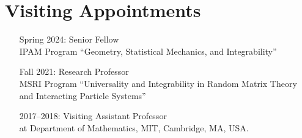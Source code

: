 \documentclass[letterpaper,11pt]{article}
\begin{document}
\section*{Visiting Appointments}

\begin{itemize}
	\item [Spring 2024:]
		  Senior Fellow
		  \\
		  IPAM Program ``Geometry, Statistical Mechanics, and Integrability''
	\item [Fall 2021:]
		  Research Professor
		  \\
		  MSRI Program ``Universality and Integrability in Random Matrix Theory and Interacting Particle Systems''
	\item
	      [2017--2018:]
	      Visiting Assistant Professor\\ at Department of Mathematics, MIT,
	      Cambridge, MA, USA.
\end{itemize}
\end{document}
